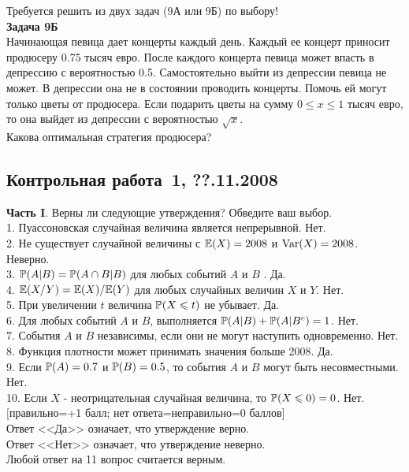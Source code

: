 \documentclass[pdftex,12pt,a4paper]{article}
\begin{document}
Требуется решить \textbf{} из двух задач (9А или 9Б) по
выбору! \\

\textbf{Задача 9Б} \\
Начинающая певица дает концерты каждый день. Каждый ее концерт приносит продюсеру 0.75 тысяч евро. После каждого концерта певица может впасть в депрессию с вероятностью 0.5. Самостоятельно выйти из депрессии певица не может. В депрессии она не в состоянии проводить концерты. Помочь ей могут только цветы от продюсера. Если подарить цветы на сумму $0\le x\le 1$ тысяч евро, то она выйдет из депрессии с вероятностью $\sqrt{x}$. \\
Какова оптимальная стратегия продюсера? \\


\subsection{Контрольная работа \No\,1, ??.11.2008}

\textbf{Часть I}. Верны ли следующие утверждения? Обведите ваш выбор. \\

1. Пуассоновская случайная величина является непрерывной. Нет. \\
2. Не существует случайной величины с $\E(X)=2008$ и $\Var(X)=2008$. Неверно. \\
3. $\P(A|B)=\P(A\cap B|B)$ для любых событий $A$ и $B$ . Да. \\
4. $\E(X/Y)=\E(X)/\E(Y)$ для любых случайных величин $X$ и $Y$. Нет. \\
5. При увеличении $t$ величина $\P(X\le t)$ не убывает. Да. \\
6. Для любых событий $A$ и $B$, выполняется $\P(A|B)+\P(A|B^{c})=1$. Нет. \\
7. События $A$ и $B$ независимы, если они не могут наступить одновременно. Нет. \\
8. Функция плотности может принимать значения больше 2008. Да. \\
9. Если $\P(A)=0.7$ и $\P(B)=0.5$, то события $A$ и $B$ могут быть несовместными. Нет. \\
10. Если $X$ - неотрицательная случайная величина, то $\P(X\le 0)=0$. Нет. \\

$[$правильно=+1 балл; нет ответа=неправильно=0 баллов$]$ \\
Ответ <<Да>> означает, что утверждение верно. \\
Ответ <<Нет>> означает, что утверждение неверно. \\
Любой ответ на 11 вопрос считается верным. \\
\end{document}
